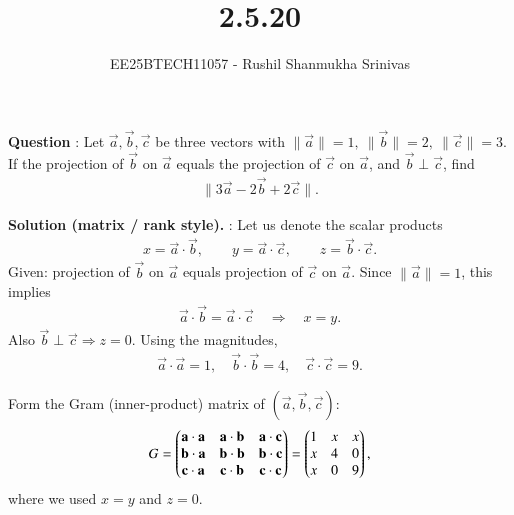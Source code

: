 \documentclass[journal]{IEEEtran}
\begin{document}




\title{2.5.20}
\author{EE25BTECH11057 - Rushil Shanmukha Srinivas
}
{\let\newpage\relax\maketitle}

\renewcommand{\thefigure}{\theenumi}
\renewcommand{\thetable}{\theenumi}
\setlength{\intextsep}{10pt} %

\renewcommand{\thetable}{\theenumi}


\textbf{Question} : 
Let $\vec a,\vec b,\vec c$ be three vectors with $\lVert \vec a\rVert=1,\ \lVert\vec b\rVert=2,\ \lVert\vec c\rVert=3$. 
If the projection of $\vec b$ on $\vec a$ equals the projection of $\vec c$ on $\vec a$, and $\vec b\perp\vec c$, find
\begin{align}
\bigl\lVert 3\vec a-2\vec b+2\vec c\bigr\rVert.
\end{align}

\bigskip

\textbf{Solution (matrix / rank style).} :
Let us denote the scalar products
\begin{align}
x=\vec a\cdot\vec b,\qquad y=\vec a\cdot\vec c,\qquad z=\vec b\cdot\vec c .
\end{align}
Given: projection of $\vec b$ on $\vec a$ equals projection of $\vec c$ on $\vec a$.
Since $\lVert\vec a\rVert=1$, this implies
\begin{align}
\vec a\cdot\vec b=\vec a\cdot\vec c \quad\Rightarrow\quad x=y.
\end{align}
Also $\vec b\perp\vec c\Rightarrow z=0$. Using the magnitudes,
\begin{align}
\vec a\cdot\vec a=1,\quad \vec b\cdot\vec b=4,\quad \vec c\cdot\vec c=9.
\end{align}

Form the Gram (inner-product) matrix of $(\vec a,\vec b,\vec c)$:
\begin{align}
G=\begin{pmatrix}\mathbf a\cdot\mathbf a & \mathbf a\cdot\mathbf b & \mathbf a\cdot\mathbf c\\
\mathbf b\cdot\mathbf a & \mathbf b\cdot\mathbf b & \mathbf b\cdot\mathbf c\\
\mathbf c\cdot\mathbf a & \mathbf c\cdot\mathbf b & \mathbf c\cdot\mathbf c\end{pmatrix}
=
\begin{pmatrix}1 & x & x\\
x & 4 & 0\\
x & 0 & 9\end{pmatrix}
,
\end{align}
where we used $x=y$ and $z=0$.
\end{document}
